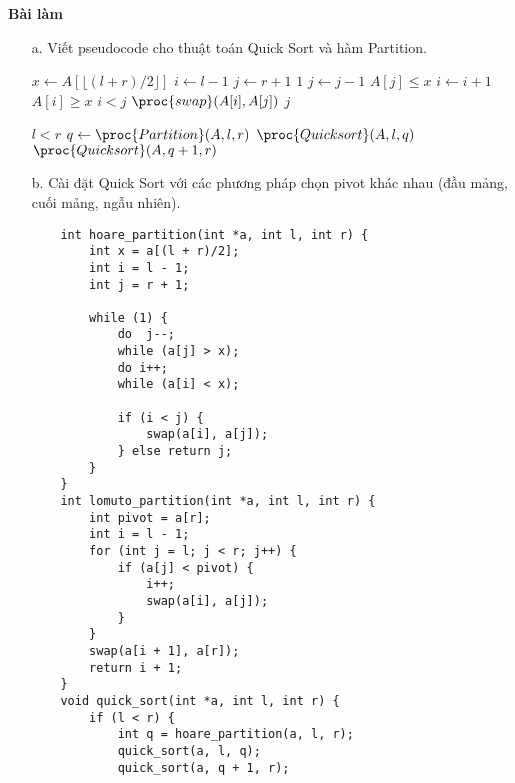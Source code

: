 \documentclass[12pt,a4paper]{article}
\begin{document}
\begin{center}
    \textbf{Bài làm}
\end{center}

\begin{enumerate}
    \item[a.] Viết pseudocode cho thuật toán Quick Sort và hàm Partition.
    \begin{codebox}
    \li $x \gets A[\lfloor (l+r)/2 \rfloor]$ 
    \li $i \gets l - 1$
    \li $j \gets r + 1$
    \li \While $1$
        \Do
            \li \Repeat
                \li $j \gets j - 1$
            \li \Until $A[j] \le x$
            \li \Repeat
                \li $i \gets i + 1$
            \li \Until $A[i] \ge x$
            \li \If $i < j$
            \Then
                \li $\proc{swap}(A[i], A[j])$
            \li \Else
                \li \Return $j$
            \End
       \End
    \end{codebox}

    \begin{codebox}
    \li \If $l < r$
        \Then
            \li $q \gets \proc{Partition}(A, l, r)$
            \li $\proc{Quicksort}(A, l, q)$
            \li $\proc{Quicksort}(A, q + 1, r)$
        \End
    \end{codebox}

    \item[b.] Cài đặt Quick Sort với các phương pháp chọn pivot khác nhau 
              (đầu mảng, cuối mảng, ngẫu nhiên).
    \begin{verbatim}
    int hoare_partition(int *a, int l, int r) {
        int x = a[(l + r)/2];
        int i = l - 1;
        int j = r + 1;
        
        while (1) {
            do  j--;
            while (a[j] > x);
            do i++;
            while (a[i] < x);

            if (i < j) {
                swap(a[i], a[j]);
            } else return j;
        }
    }
    int lomuto_partition(int *a, int l, int r) {
        int pivot = a[r];
        int i = l - 1;
        for (int j = l; j < r; j++) {
            if (a[j] < pivot) {
                i++;
                swap(a[i], a[j]);
            }
        }
        swap(a[i + 1], a[r]);
        return i + 1;
    }
    void quick_sort(int *a, int l, int r) {
        if (l < r) {
            int q = hoare_partition(a, l, r);
            quick_sort(a, l, q); 
            quick_sort(a, q + 1, r);


\end{verbatim}
\end{enumerate}
\end{document}
